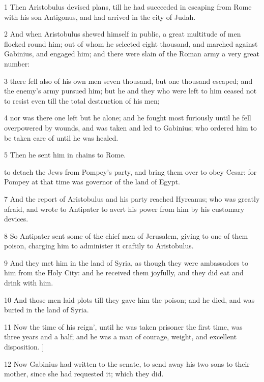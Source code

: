1 Then Aristobulus devised plans, till he had succeeded in escaping from Rome with his son Antigonus, and had arrived in the city of Judah. 

2 And when Aristobulus shewed himself in public, a great multitude of men flocked round him; out of whom he selected eight thousand, and marched against Gabinius, and engaged him; and there were slain of the Roman army a very great number: 

3 there fell also of his own men seven thousand, but one thousand escaped; and the enemy’s army pursued him; but he and they who were left to him ceased not to resist even till the total destruction of his men; 

4 nor was there one left but he alone; and he fought most furiously until he fell overpowered by wounds, and was taken and led to Gabinius; who ordered him to be taken care of until he was healed. 

5 Then he sent him in chains to Rome. 

\par [And he remained shut up in prison until the reign of Caesar; who brought him out of prison, and loaded him with gifts and favours; 

6 and giving to him two generals and twelve thousand men, sent him into the land of Judah, [B.C. 49.] to detach the Jews from Pompey’s party, and bring them over to obey Cesar: for Pompey at that time was governor of the land of Egypt. 

7 And the report of Aristobulus and his party reached Hyrcanus; who was greatly afraid, and wrote to Antipater to avert his power from him by his customary devices. 

8 So Antipater sent some of the chief men of Jerusalem, giving to one of them poison, charging him to administer it craftily to Aristobulus. 

9 And they met him in the land of Syria, as though they were ambassadors to him from the Holy City: and he received them joyfully, and they did eat and drink with him. 

10 And those men laid plots till they gave him the poison; and he died, and was buried in the land of Syria. 

11 Now the time of his reign’, until he was taken prisoner the first time, was three years and a half; and he was a man of courage, weight, and excellent disposition. ] 

12 Now Gabinius had written to the senate, to send away his two sons to their mother, since she had requested it; which they did. 

